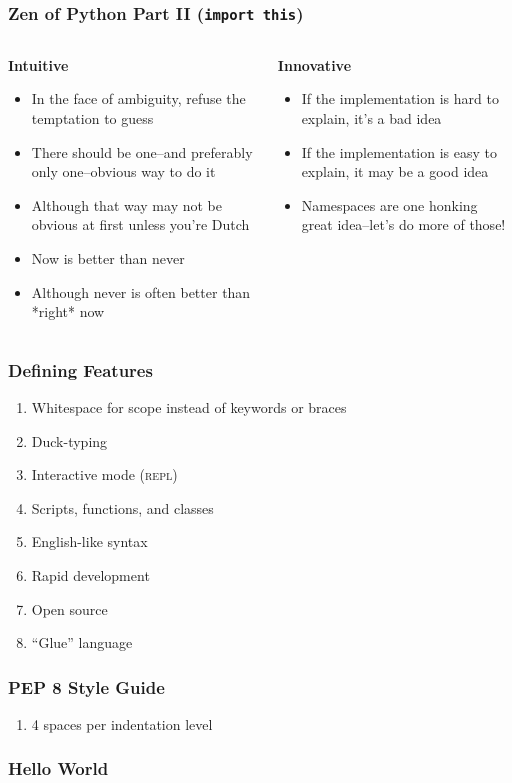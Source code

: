\documentclass{beamer}
\begin{document}
  \begin{frame}
    \frametitle{Zen of Python Part II (\texttt{import this})}
    \begin{columns}
      \begin{column}{0.60\textwidth}
	\textbf{Intuitive}
        \begin{itemize}
          \item In the face of ambiguity, refuse the temptation to guess
          \item There should be one--and preferably only one--obvious way to do it
	  \item Although that way may not be obvious at first unless you're Dutch
	  \item Now is better than never
          \item Although never is often better than *right* now
        \end{itemize}
      \end{column}
      \begin{column}{0.40\textwidth}
        \textbf{Innovative}
        \begin{itemize}
       	  \item If the implementation is hard to explain, it's a bad idea
	  \item If the implementation is easy to explain, it may be a good idea
	  \item Namespaces are one honking great idea--let's do more of those!
        \end{itemize}
      \end{column}
    \end{columns}
  \end{frame}

  \begin{frame}
    \frametitle{Defining Features}
    \begin{enumerate}
      \item Whitespace for scope instead of keywords or braces
      \item Duck-typing
      \item Interactive mode (\textsc{repl})
      \item Scripts, functions, and classes
      \item English-like syntax
      \item Rapid development
      \item Open source
      \item ``Glue'' language
    \end{enumerate}
  \end{frame}

  \begin{frame}
    \frametitle{PEP 8 Style Guide}
    \begin{enumerate}
      \item 4 spaces per indentation level
    \end{enumerate}
  \end{frame}

  \begin{frame}
    \frametitle{Hello World}
    \inputminted{python}{hello.py}
  \end{frame}
    
\end{document}
